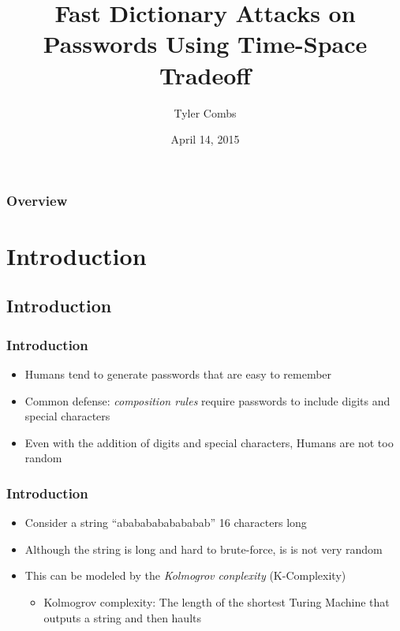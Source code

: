 \documentclass{beamer}
\title[Exit Exam]{Fast Dictionary Attacks on Passwords Using Time-Space Tradeoff} %
\author{Tyler Combs} %
\institute[OU] %
{
The University of Oklahoma \\ %
\medskip
\textit{tyler.combs@ou.edu} %
}
\date{April 14, 2015} %
\begin{document}
\begin{frame}
\titlepage %
\end{frame}

\begin{frame}
\frametitle{Overview} %
\tableofcontents %
\end{frame}


\section{Introduction} 
\subsection{Introduction}


\begin{frame}
\frametitle{Introduction}
\begin{itemize}
\item Humans tend to generate passwords that are easy to remember
\item Common defense: \emph{composition rules} require passwords to include digits and special characters
\item Even with the addition of digits and special characters, Humans are not too random
\end{itemize}
\end{frame}

\begin{frame}
\frametitle{Introduction}
\begin{itemize}
\item Consider a string ``abababababababab'' 16 characters long
\item Although the string is long and hard to brute-force, is is not very random
\item This can be modeled by the \emph{Kolmogrov conplexity} (K-Complexity)
\begin{itemize}
\item Kolmogrov complexity: The length of the shortest Turing Machine that outputs a string and then haults
\end{itemize}
\end{itemize}
\end{frame}
\end{document}

